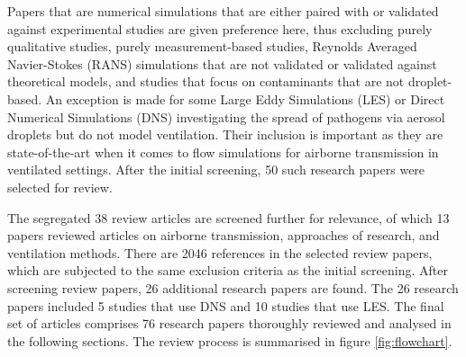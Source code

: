 \documentclass[a4paper,12pt]{elsarticle}
\begin{document}
Papers that are numerical simulations that are either paired with or validated against experimental studies are given preference here, thus excluding purely qualitative studies, purely measurement-based studies, Reynolds Averaged Navier-Stokes (RANS) simulations that are not validated or validated against theoretical models, and studies that focus on contaminants that are not droplet-based. An exception is made for some Large Eddy Simulations (LES) or Direct Numerical Simulations (DNS) investigating the spread of pathogens via aerosol droplets but do not model ventilation. Their inclusion is important as they are state-of-the-art when it comes to flow simulations for airborne transmission in ventilated settings. After the initial screening, 50 such research papers were selected for review. 

The segregated 38 review articles are screened further for relevance, of which 13 papers reviewed articles on airborne transmission, approaches of research, and ventilation methods. There are 2046 references in the selected review papers, which are subjected to the same exclusion criteria as the initial screening. After screening review papers, 26 additional research papers are found. The 26 research papers included 5 studies that use DNS and 10 studies that use LES. The final set of articles comprises 76 research papers thoroughly reviewed and analysed in the following sections. The review process is summarised in figure \ref{fig:flowchart}.
\end{document}
